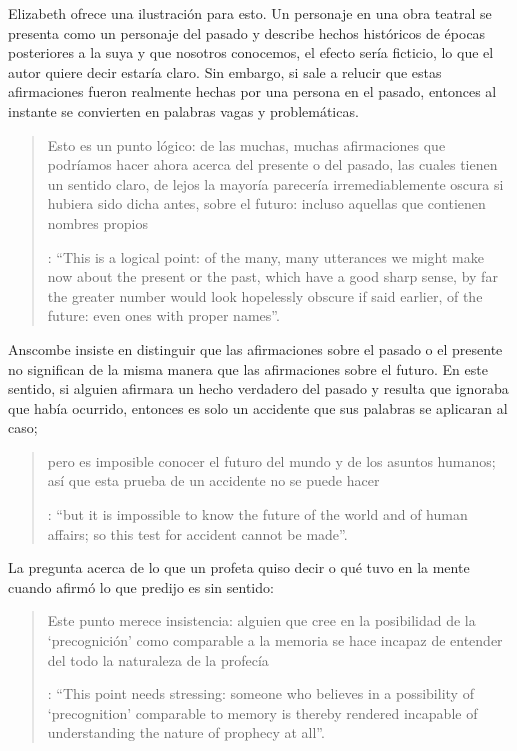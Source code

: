 Elizabeth ofrece una ilustración para esto. Un personaje en una obra teatral se presenta como un personaje del pasado y describe hechos históricos de épocas posteriores a la suya y que nosotros conocemos, el efecto sería ficticio, lo que el autor quiere decir estaría claro. Sin embargo, si sale a relucir que estas afirmaciones fueron realmente hechas por una persona en el pasado, entonces al instante se convierten en palabras vagas y problemáticas. \blockquote[{\Cite[31]{anscombe2008faith:prophandmi}}: \enquote{This is a logical point: of the many, many utterances we might make now about the present or the past, which have a good sharp sense, by far the greater number would look hopelessly obscure if said earlier, of the future: even ones with proper names}.]{Esto es un punto lógico: de las muchas, muchas afirmaciones que podríamos hacer ahora acerca del presente o del pasado, las cuales tienen un sentido claro, de lejos la mayoría parecería irremediablemente oscura si hubiera sido dicha antes, sobre el futuro: incluso aquellas que contienen nombres propios} Anscombe insiste en distinguir que las afirmaciones sobre el pasado o el presente no significan de la misma manera que las afirmaciones sobre el futuro. En este sentido, si alguien afirmara un hecho verdadero del pasado y resulta que ignoraba que había ocurrido, entonces es solo un accidente que sus palabras se aplicaran al caso; \blockquote[{\Cite[29]{anscombe2008faith:prophandmi}}: \enquote{but it is impossible to know the future of the world and of human affairs; so this test for accident cannot be made}.]{pero es imposible conocer el futuro del mundo y de los asuntos humanos; así que esta prueba de un accidente no se puede hacer}. La pregunta acerca de lo que un profeta quiso decir o qué tuvo en la mente cuando afirmó lo que predijo es sin sentido: \blockquote[{\Cite[29]{anscombe2008faith:prophandmi}}: \enquote{This point needs stressing: someone who believes in a possibility of `precognition' comparable to memory is thereby rendered incapable of understanding the nature of prophecy at all}.]{Este punto merece insistencia: alguien que cree en la posibilidad de la `precognición' como comparable a la memoria se hace incapaz de entender del todo la naturaleza de la profecía}.

